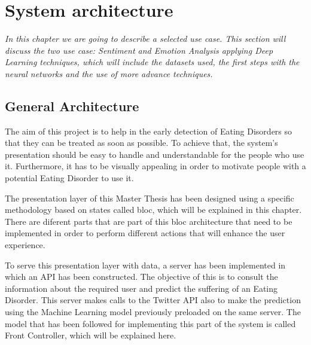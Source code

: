 \chapter{System architecture}
\label{chap:architecture}

\textit{In this chapter we are going to describe a selected use case. This section will discuss the two use case: Sentiment and Emotion Analysis applying Deep Learning techniques, which will include the datasets used, the first steps with the neural networks and the use of more advance techniques.}

\clearpage

\section{General Architecture}


The aim of this project is to help in the early detection of Eating Disorders so that they can be treated as soon as possible. To achieve that, the system's presentation should be easy to handle and understandable for the people who use it. Furthermore, it has to be visually appealing in order to motivate people with a potential Eating Disorder to use it.

The presentation layer of this Master Thesis has been designed using a specific methodology based on states called bloc, which will be explained in this chapter. There are diferent parts that are part of this bloc architecture that need to be implemented in order to perform different actions that will enhance the user experience.

To serve this presentation layer with data, a server has been implemented in which an API has been constructed. The objective of this is to consult the information about the required user and predict the suffering of an Eating Disorder. This server makes calls to the Twitter API also to make the prediction using the Machine Learning model previously preloaded on the same server. The model that has been followed for implementing this part of the system is called Front Controller, which will be explained here.

